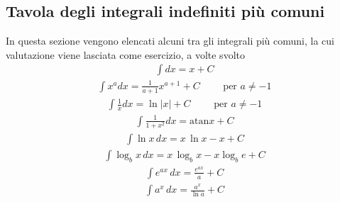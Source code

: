 \documentclass[letterpaper,10pt,english]{jupyterBook}
\begin{document}
\subsection{Tavola degli integrali indefiniti più comuni}
\label{\detokenize{ch/infinitesimal_calculus/integrals-table:tavola-degli-integrali-indefiniti-piu-comuni}}\label{\detokenize{ch/infinitesimal_calculus/integrals-table:infinitesimal-calculus-integrals-table}}\label{\detokenize{ch/infinitesimal_calculus/integrals-table::doc}}
\sphinxAtStartPar
In questa sezione vengono elencati alcuni tra gli integrali più comuni, la cui valutazione viene lasciata come esercizio, a volte svolto
\begin{equation*}
\begin{split}\int dx             = x + C\end{split}
\end{equation*}\begin{equation*}
\begin{split}\int x^a dx         = \frac{1}{a+1} x^{a+1} + C  \qquad \text{ per } a \ne -1\end{split}
\end{equation*}\begin{equation*}
\begin{split}\int \frac{1}{x} dx = \ln |x| + C  \qquad \text{ per } a \ne -1\end{split}
\end{equation*}\begin{equation*}
\begin{split}\int \frac{1}{1+x^2} dx = \text{atan} x + C\end{split}
\end{equation*}\begin{equation*}
\begin{split}\int \ln x \, dx    = x \, \ln x - x + C\end{split}
\end{equation*}\begin{equation*}
\begin{split}\int \log_b x \, dx    = x \, \log_b x - x \log_b e + C\end{split}
\end{equation*}\begin{equation*}
\begin{split}\int e^{a x} \, dx  = \frac{e^{ax}}{a} + C\end{split}
\end{equation*}\begin{equation*}
\begin{split}\int a^x \, dx  = \frac{a^x}{\ln a} + C\end{split}

\end{equation*}
\end{document}
